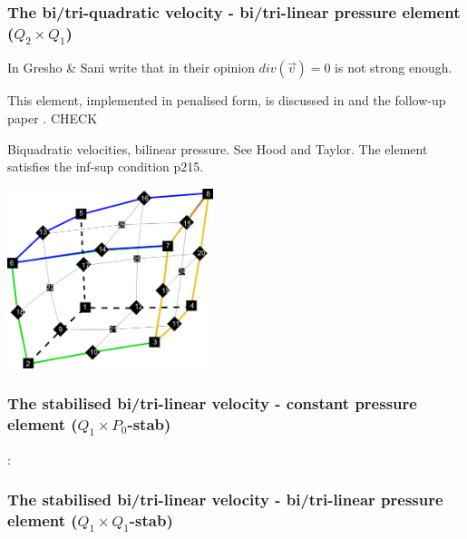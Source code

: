 \subsubsection{The bi/tri-quadratic velocity - bi/tri-linear pressure element ($Q_2 \times Q_1$)}
\label{ss:pairq2q1}

\begin{minipage}[t]{0.5\textwidth}

\end{minipage}
\begin{minipage}[t]{0.5\textwidth}

\end{minipage}


In \cite{grsa} Gresho \& Sani write that in their opinion $div(\vec v)=0$ is not strong enough.

This element, implemented in penalised form, is discussed in \cite{been79} and the follow-up paper \cite{been80}. CHECK

Biquadratic velocities, bilinear pressure. See Hood and Taylor. The element satisfies the inf-sup condition \cite{hugh}p215. 

\begin{center}
\includegraphics[width=6cm]{images/q2q1/q2numering}
\end{center}

\subsubsection{The stabilised bi/tri-linear velocity -  constant pressure element ($Q_1\times P_0$-stab)}

\Literature: \cite{sike90,vibo92,kesi92,qizh07,lisi12,chco01,chri02}

\subsubsection{The stabilised bi/tri-linear velocity -  bi/tri-linear pressure element ($Q_1\times Q_1$-stab)}

